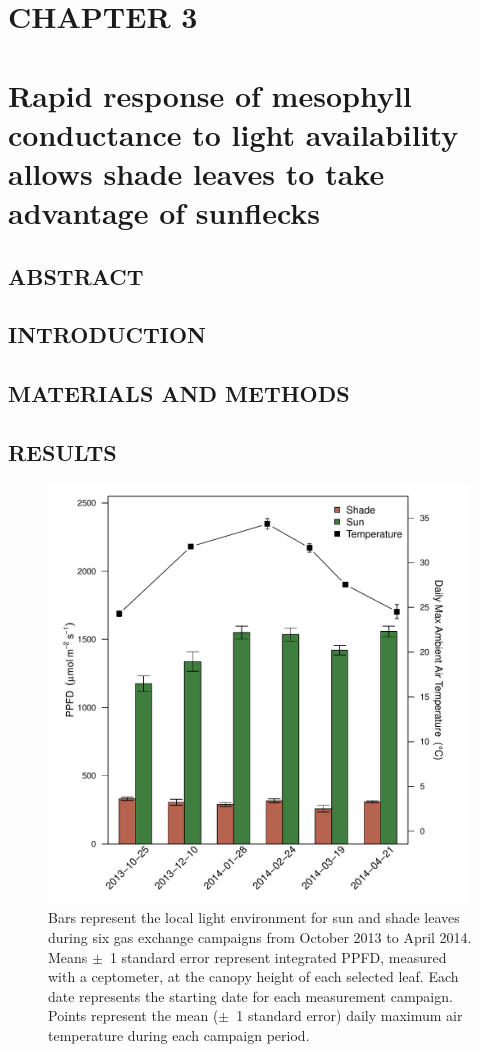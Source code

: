 \documentclass[a4paper]{article}\usepackage[]{graphicx}\usepackage[]{color}
\begin{document}



\section*{CHAPTER 3 \\ \mbox{ }\\ Rapid response of mesophyll conductance to light availability allows shade leaves to take advantage of sunflecks}
\subsection*{ABSTRACT}
\subsection*{INTRODUCTION}
\subsection*{MATERIALS AND METHODS}
\subsection*{RESULTS}

\begin{figure}[h!]
    \centering
    \includegraphics[width=0.99\textwidth]{ppfd2.pdf}
    \caption{Bars represent the local light environment for sun and shade leaves during six gas exchange campaigns from October 2013 to April 2014. Means $\pm$~1 standard error represent integrated PPFD, measured with a ceptometer, at the canopy height of each selected leaf. Each date represents the starting date for each measurement campaign. Points represent the mean ($\pm$~1 standard error) daily maximum air temperature during each campaign period.}
    \label{fig:figure 3.1}
\end{figure}
\end{document}
